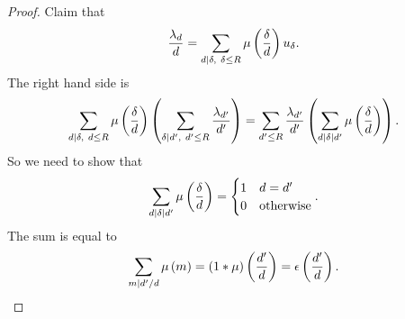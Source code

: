 \begin{proof}

Claim that
\begin{equation}
\label{eq:8}
\dfrac{\lambda_d}{d} = \sum_{d \mid \delta, \ \delta \le R} \mu\br{\dfrac{\delta}{d}}u_\delta.
\end{equation}
The right hand side is
$$ \sum_{d \mid \delta, \ d \le R} \mu\br{\dfrac{\delta}{d}}\br{\sum_{\delta \mid d', \ d' \le R} \dfrac{\lambda_{d'}}{d'}} = \sum_{d' \le R} \dfrac{\lambda_{d'}}{d'}\br{\sum_{d \mid \delta \mid d'} \mu\br{\dfrac{\delta}{d}}}. $$
So we need to show that
$$ \sum_{d \mid \delta \mid d'} \mu\br{\dfrac{\delta}{d}} =
\begin{cases}
1 & d = d' \\
0 & \text{otherwise}
\end{cases}.
$$
The sum is equal to
$$ \sum_{m \mid d' / d} \mu\br{m} = \br{1 * \mu}\br{\dfrac{d'}{d}} = \epsilon\br{\dfrac{d'}{d}}. $$

\pagebreak


\end{proof}
